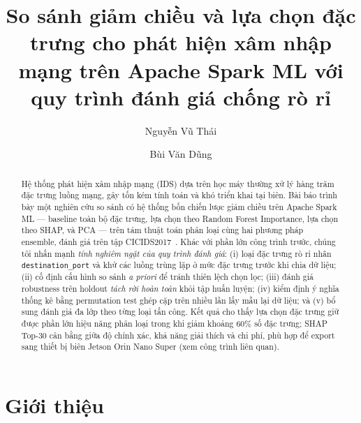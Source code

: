 \documentclass[runningheads]{llncs}
\begin{document}
\title{So sánh giảm chiều và lựa chọn đặc trưng cho phát hiện xâm nhập mạng trên Apache Spark ML với quy trình đánh giá chống rò rỉ}


\author{Nguyễn Vũ Thái \and Bùi Văn Dũng}

\maketitle

\begin{abstract}
Hệ thống phát hiện xâm nhập mạng (IDS) dựa trên học máy thường xử lý hàng trăm đặc trưng luồng mạng, gây tốn kém tính toán và khó triển khai tại biên. Bài báo trình bày một nghiên cứu so sánh có hệ thống bốn chiến lược giảm chiều trên Apache Spark ML --- baseline toàn bộ đặc trưng, lựa chọn theo Random Forest Importance, lựa chọn theo SHAP, và PCA --- trên tám thuật toán phân loại cùng hai phương pháp ensemble, đánh giá trên tập CICIDS2017~\cite{sharafaldin2018toward}. Khác với phần lớn công trình trước, chúng tôi nhấn mạnh \emph{tính nghiêm ngặt của quy trình đánh giá}: (i) loại đặc trưng rò rỉ nhãn \texttt{destination\_port} và khử các luồng trùng lặp ở mức đặc trưng trước khi chia dữ liệu; (ii) cố định cấu hình so sánh \emph{a priori} để tránh thiên lệch chọn lọc; (iii) đánh giá robustness trên holdout \emph{tách rời hoàn toàn} khỏi tập huấn luyện; (iv) kiểm định ý nghĩa thống kê bằng permutation test ghép cặp trên nhiều lần lấy mẫu lại dữ liệu; và (v) bổ sung đánh giá đa lớp theo từng loại tấn công. Kết quả cho thấy lựa chọn đặc trưng giữ được phần lớn hiệu năng phân loại trong khi giảm khoảng 60\% số đặc trưng; SHAP Top-30 cân bằng giữa độ chính xác, khả năng giải thích và chi phí, phù hợp để export sang thiết bị biên Jetson Orin Nano Super (xem công trình liên quan).

\end{abstract}

\section{Giới thiệu}
\label{sec:intro}
\end{document}
